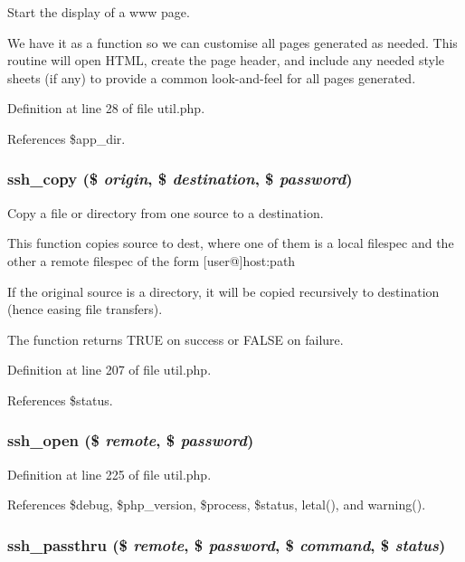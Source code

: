 Start the display of a www page. 

We have it as a function so we can customise all pages generated as needed. This routine will open HTML, create the page header, and include any needed style sheets (if any) to provide a common look-and-feel for all pages generated. 

Definition at line 28 of file util.php.

References \$app\_\-dir.
\subsubsection{\setlength{\rightskip}{0pt plus 5cm}ssh\_\-copy (\$ {\em origin}, \$ {\em destination}, \$ {\em password})}\label{util_8php_a6}


Copy a file or directory from one source to a destination. 

This function copies source to dest, where one of them is a local filespec and the other a remote filespec of the form [user@]host:path

If the original source is a directory, it will be copied recursively to destination (hence easing file transfers).

The function returns TRUE on success or FALSE on failure. 

Definition at line 207 of file util.php.

References \$status.
\subsubsection{\setlength{\rightskip}{0pt plus 5cm}ssh\_\-open (\$ {\em remote}, \$ {\em password})}\label{util_8php_a7}




Definition at line 225 of file util.php.

References \$debug, \$php\_\-version, \$process, \$status, letal(), and warning().
\subsubsection{\setlength{\rightskip}{0pt plus 5cm}ssh\_\-passthru (\$ {\em remote}, \$ {\em password}, \$ {\em command}, \$ {\em status})}\label{util_8php_a5}


